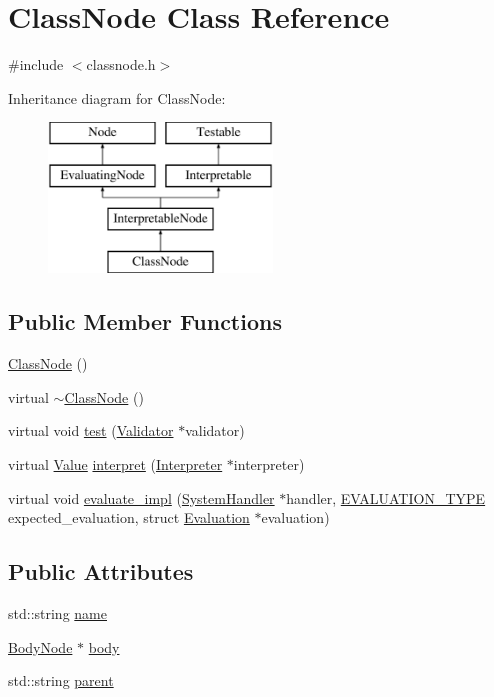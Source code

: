 \hypertarget{classClassNode}{}\section{Class\+Node Class Reference}
\label{classClassNode}


{\ttfamily \#include $<$classnode.\+h$>$}

Inheritance diagram for Class\+Node\+:\begin{figure}[H]
\begin{center}
\leavevmode
\includegraphics[height=4.000000cm]{classClassNode}
\end{center}
\end{figure}
\subsection*{Public Member Functions}
\begin{DoxyCompactItemize}
\item 
\hyperlink{classClassNode_a217389d155a37b90d12fa6a9d49d6326}{Class\+Node} ()
\item 
virtual \hyperlink{classClassNode_a3c0d617d08db3d2f0e9ade88f30bb04d}{$\sim$\+Class\+Node} ()
\item 
virtual void \hyperlink{classClassNode_ac5147024d81a0c6841e9453025e4f988}{test} (\hyperlink{classValidator}{Validator} $\ast$validator)
\item 
virtual \hyperlink{classValue}{Value} \hyperlink{classClassNode_a7515421face64d74e99e180fb297684b}{interpret} (\hyperlink{classInterpreter}{Interpreter} $\ast$interpreter)
\item 
virtual void \hyperlink{classClassNode_ab969f53cd181de184a8f82273dbd77ab}{evaluate\+\_\+impl} (\hyperlink{classSystemHandler}{System\+Handler} $\ast$handler, \hyperlink{statics_8h_a6664c451ca7787483a7981cc1de68dbb}{E\+V\+A\+L\+U\+A\+T\+I\+O\+N\+\_\+\+T\+Y\+PE} expected\+\_\+evaluation, struct \hyperlink{structEvaluation}{Evaluation} $\ast$evaluation)
\end{DoxyCompactItemize}
\subsection*{Public Attributes}
\begin{DoxyCompactItemize}
\item 
std\+::string \hyperlink{classClassNode_a1fc3152f6442b5f6913ec72f26afacbe}{name}
\item 
\hyperlink{classBodyNode}{Body\+Node} $\ast$ \hyperlink{classClassNode_ad5c089e050c2c7da583376fe16762689}{body}
\item 
std\+::string \hyperlink{classClassNode_a844a82eec88057b0faaf203f5a60a301}{parent}
\end{DoxyCompactItemize}
